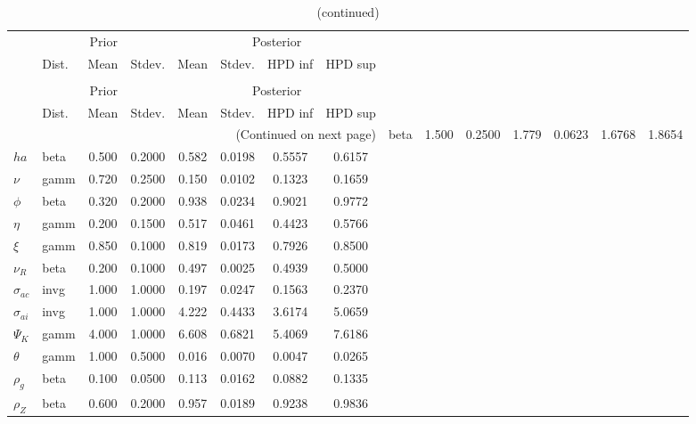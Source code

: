  
\begin{center}
\begin{longtable}{llcccccc} 
\caption{Results from Metropolis-Hastings (parameters)}
 \label{Table:MHPosterior:1}\\
\toprule 
  & \multicolumn{3}{c}{Prior}  &  \multicolumn{4}{c}{Posterior} \\
  \cmidrule(r{.75em}){2-4} \cmidrule(r{.75em}){5-8}
  & Dist. & Mean  & Stdev. & Mean & Stdev. & HPD inf & HPD sup\\
\midrule \endfirsthead 
\caption{(continued)}\\\toprule 
  & \multicolumn{3}{c}{Prior}  &  \multicolumn{4}{c}{Posterior} \\
  \cmidrule(r{.75em}){2-4} \cmidrule(r{.75em}){5-8}
  & Dist. & Mean  & Stdev. & Mean & Stdev. & HPD inf & HPD sup\\
\midrule \endhead 
\bottomrule \multicolumn{8}{r}{(Continued on next page)} \endfoot 
\bottomrule \endlastfoot 
${\sigma}$ & beta &   1.500 & 0.2500 &   1.779& 0.0623 &  1.6768 &  1.8654 \\ 
${ha}$ & beta &   0.500 & 0.2000 &   0.582& 0.0198 &  0.5557 &  0.6157 \\ 
$\nu$ & gamm &   0.720 & 0.2500 &   0.150& 0.0102 &  0.1323 &  0.1659 \\ 
${\phi}$ & beta &   0.320 & 0.2000 &   0.938& 0.0234 &  0.9021 &  0.9772 \\ 
${\eta}$ & gamm &   0.200 & 0.1500 &   0.517& 0.0461 &  0.4423 &  0.5766 \\ 
$\xi$ & gamm &   0.850 & 0.1000 &   0.819& 0.0173 &  0.7926 &  0.8500 \\ 
${\nu_R}$ & beta &   0.200 & 0.1000 &   0.497& 0.0025 &  0.4939 &  0.5000 \\ 
${\sigma_{ac}}$ & invg &   1.000 & 1.0000 &   0.197& 0.0247 &  0.1563 &  0.2370 \\ 
${\sigma_{ai}}$ & invg &   1.000 & 1.0000 &   4.222& 0.4433 &  3.6174 &  5.0659 \\ 
${\Psi_{K}}$ & gamm &   4.000 & 1.0000 &   6.608& 0.6821 &  5.4069 &  7.6186 \\ 
${\theta}$ & gamm &   1.000 & 0.5000 &   0.016& 0.0070 &  0.0047 &  0.0265 \\ 
${\rho_g}$ & beta &   0.100 & 0.0500 &   0.113& 0.0162 &  0.0882 &  0.1335 \\ 
${\rho_Z}$ & beta &   0.600 & 0.2000 &   0.957& 0.0189 &  0.9238 &  0.9836 \\ 

\end{longtable}
\end{center}
